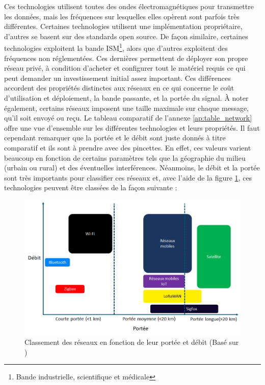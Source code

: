 \noindent
Ces technologies utilisent toutes des ondes électromagnétiques pour transmettre les données, mais les fréquences sur lesquelles elles opèrent sont parfois très différentes. Certaines technologies utilisent une implémentation propriétaire, d'autres se basent sur des standards open source. \cite{foubert_iot} De façon similaire, certaines technologies exploitent la bande ISM\footnote{Bande industrielle, scientifique et médicale}, alors que d'autres exploitent des fréquences non réglementées. Ces dernières permettent de déployer son propre réseau privé, à condition d'acheter et configurer tout le matériel requis ce qui peut demander un investissement initial assez important. Ces différences accordent des propriétés distinctes aux réseaux en ce qui concerne le coût d'utilisation et déploiement, la bande passante, et la portée du signal. À noter également, certains réseaux imposent une taille maximale sur chaque message, qu'il soit envoyé ou reçu. Le tableau comparatif de l'annexe \ref{ap:table_network} offre une vue d'ensemble sur les différentes technologies et leurs propriétés. Il faut cependant remarquer que la portée et le débit sont juste donnés à titre comparatif et ils sont à prendre avec des pincettes. En effet, ces valeurs varient beaucoup en fonction de certains paramètres tels que la géographie du milieu (urbain ou rural) et des éventuelles interférences. Néanmoins, le débit et la portée sont très importants pour classifier ces réseaux et, avec l'aide de la figure \ref{fig:range_iot}, ces technologies peuvent être classées de la façon suivante \cite{orange_iot} :


\begin{figure}
  \includegraphics[width=\textwidth]{img/state_of_the_art/range_iot.png}
  \caption{Classement des réseaux en fonction de leur portée et débit (Basé sur \cite{mekki2018overview})}
  \label{fig:range_iot}
\end{figure}

